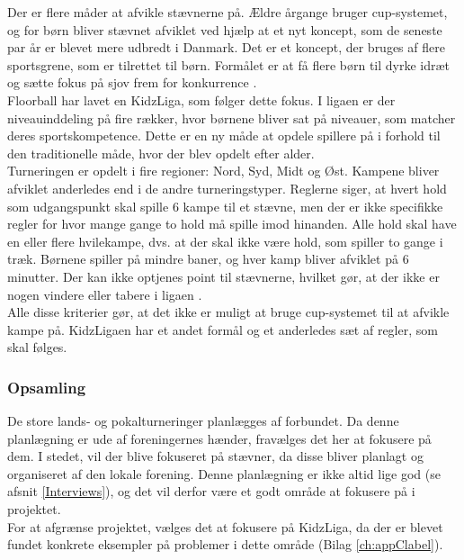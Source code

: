Der er flere måder at afvikle stævnerne på. Ældre årgange bruger cup-systemet, og for børn bliver stævnet afviklet ved hjælp at et nyt koncept, som de seneste par år er blevet mere udbredt i Danmark. Det er et koncept, der bruges af flere sportsgrene, som er tilrettet til børn. Formålet er at få flere børn til dyrke idræt og sætte fokus på sjov frem for konkurrence \citep{kidzRegler}.\\
Floorball har lavet en KidzLiga, som følger dette fokus. I ligaen er der niveauinddeling på fire rækker, hvor børnene bliver sat på niveauer, som matcher deres sportskompetence. Dette er en ny måde at opdele spillere på i forhold til den traditionelle måde, hvor der blev opdelt efter alder.\\
Turneringen er opdelt i fire regioner: Nord, Syd, Midt og Øst. Kampene bliver afviklet anderledes end i de andre turneringstyper. Reglerne siger, at hvert hold som udgangspunkt skal spille 6 kampe til et stævne, men der er ikke specifikke regler for hvor mange gange to hold må spille imod hinanden. Alle hold skal have en eller flere hvilekampe, dvs. at der skal ikke være hold, som spiller to gange i træk. Børnene spiller på mindre baner, og hver kamp bliver afviklet på 6 minutter. Der kan ikke optjenes point til stævnerne, hvilket gør, at der ikke er nogen vindere eller tabere i ligaen \citep{kidzRegler}.\\
Alle disse kriterier gør, at det ikke er muligt at bruge cup-systemet til at afvikle kampe på. KidzLigaen har et andet formål og et anderledes sæt af regler, som skal følges.

\subsubsection*{Opsamling}
De store lands- og pokalturneringer planlægges af forbundet. Da denne planlægning er ude af foreningernes hænder, fravælges det her at fokusere på dem. I stedet, vil der blive fokuseret på stævner, da disse bliver planlagt og organiseret af den lokale forening. Denne planlægning er ikke altid lige god (se afsnit \ref{Interviews}), og det vil derfor være et godt område at fokusere på i projektet.\\
For at afgrænse projektet, vælges det at fokusere på KidzLiga, da der er blevet fundet konkrete eksempler på problemer i dette område (Bilag \ref{ch:appClabel}). 

